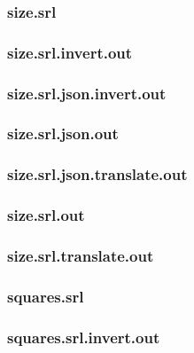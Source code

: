 \subsubsection{size.srl}
\label{app:size_srl}

\subsubsection{size.srl.invert.out}
\label{app:size_srl.invert.out}

\subsubsection{size.srl.json.invert.out}
\label{app:size_srl.json.invert.out}

\subsubsection{size.srl.json.out}
\label{app:size_srl.json.out}

\subsubsection{size.srl.json.translate.out}
\label{app:size_srl.json.translate.out}

\subsubsection{size.srl.out}
\label{app:size_srl.out}

\subsubsection{size.srl.translate.out}
\label{app:size_srl.translate.out}

\subsubsection{squares.srl}
\label{app:squares_srl}

\subsubsection{squares.srl.invert.out}
\label{app:squares_srl.invert.out}

